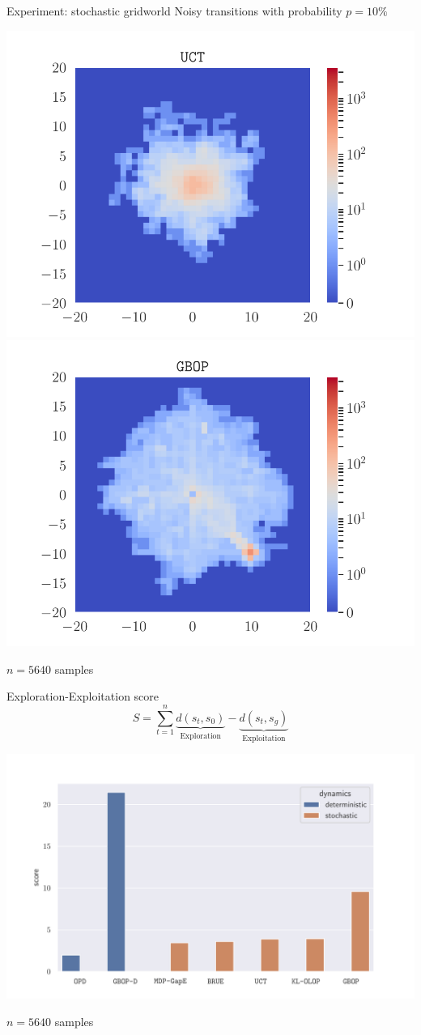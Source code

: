 \documentclass[slideopt,A4,showboxes,svgnames]{beamer}
\begin{document}
\begin{frame}{Experiment: stochastic gridworld}
Noisy transitions with probability $p=10\%$
\begin{center}
	\includegraphics[trim={1.8cm 0.4cm 1.8cm 0.7cm}, clip, width=0.43\linewidth]{../img/occupations_UCT.pdf}
	\includegraphics[trim={1.8cm 0.4cm 1.8cm 0.7cm}, clip, width=0.43\linewidth]{../img/occupations_GBOP.pdf}
	
	$n = 5640$ samples
\end{center}
\end{frame}

\begin{frame}{Exploration-Exploitation score}
$$S = \sum_{t=1}^n \underbrace{d(s_t, s_0)}_{\text{Exploration}} - \underbrace{d(s_t, s_g)}_{\text{Exploitation}}$$
\begin{center}
	\includegraphics[trim = {1.4cm 0.cm 2cm 1.5cm}, clip, width=0.7\linewidth]{../img/score.pdf}

	$n = 5640$ samples
\end{center}
\end{frame}
\end{document}
